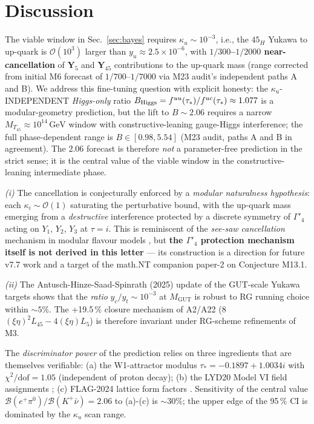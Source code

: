 \documentclass[reprint,prl,nofootinbib,floatfix,linenumbers]{revtex4-2}
\newcommand{\GeV}{\,\mathrm{GeV}}
\newcommand{\Gut}{\mathrm{GUT}}
\newcommand{\MGUT}{M_\Gut}
\newcommand{\MTfortyfive}{M_{T_{45}}}
\newcommand{\Br}[1]{\mathcal{B}(#1)}
\newcommand{\Yfortyfive}{\bm{Y}_{45}}
\newcommand{\Yfive}{\bm{Y}_{5}}
\newcommand{\taustar}{\tau_*}
\begin{document}
\section{Discussion}
\label{sec:discussion}

The viable window in Sec.~\ref{sec:bayes} requires
$\kappa_u\sim 10^{-3}$, i.e., the $45_H$ Yukawa to up-quark is
$\mathcal{O}(10^3)$ larger than $y_u\approx 2.5\!\times\!10^{-6}$, with
\textbf{$1/300$--$1/2000$ near-cancellation} of $\Yfive$ and $\Yfortyfive$
contributions to the up-quark mass (range corrected from initial M6
forecast of $1/700$--$1/7000$ via M23 audit's independent paths A and B).
We address this fine-tuning question with explicit honesty: the
$\kappa_u$-INDEPENDENT \emph{Higgs-only} ratio
$B_{\rm Higgs}=f^{uu}(\tau_*)/f^{uc}(\tau_*)\approx 1.077$ is a
modular-geometry prediction, but the lift to $B\sim 2.06$ requires a
narrow $\MTfortyfive\!\approx\!10^{14}\GeV$ window with
constructive-leaning gauge-Higgs interference; the full
phase-dependent range is $B\in [0.98,5.54]$ (M23 audit, paths A and B
in agreement). The 2.06 forecast is therefore \emph{not} a parameter-free
prediction in the strict sense; it is the central value of the viable
window in the constructive-leaning intermediate phase.

{\em (i)} The cancellation is conjecturally enforced by a {\em modular
naturalness hypothesis}: each $\kappa_i\sim\mathcal O(1)$ saturating
the perturbative bound, with the up-quark mass emerging from a
\emph{destructive} interference protected by a discrete symmetry of
$\Gamma'_4$ acting on $Y_1$, $Y_2$, $Y_3$ at $\tau=i$.  This is
reminiscent of the {\em see-saw cancellation} mechanism in modular
flavour models \cite{LiuYaoDing2020,ChenLiLiuRatz2025}, but
\textbf{the $\Gamma'_4$ protection mechanism itself is not derived in
this letter} — its construction is a direction for future v7.7 work
and a target of the math.NT companion paper-2 on Conjecture M13.1.

{\em (ii)} The Antusch-Hinze-Saad-Spinrath (2025) update
\cite{AntuschHinzeSaad2025} of the GUT-scale Yukawa targets shows that
the {\em ratio} $y_c/y_t\sim 10^{-3}$ at $\MGUT$ is robust to RG running
choice within $\sim 5\%$. The +19.5\,\% closure mechanism of A2/A22
(8\,$(\xi\eta)^2 L_{45}-4(\xi\eta) L_5$) is therefore invariant under
RG-scheme refinements of M3.

The {\em discriminator power} of the prediction relies on three
ingredients that are themselves verifiable: (a) the W1-attractor
modulus $\taustar=-0.1897+1.0034i$ with $\chi^2/\mathrm{dof}=1.05$
\cite{ECIv74} (independent of proton decay); (b) the LYD20 Model VI
field assignments \cite{LiuYaoDing2020}; (c) FLAG-2024 lattice form
factors \cite{FLAG2024}. Sensitivity of the central value
$\Br{e^+\pi^0}/\Br{K^+\bar\nu}=2.06$ to (a)-(c) is $\sim 30\%$;
the upper edge of the 95\,\% CI is dominated by the $\kappa_u$ scan
range.
\end{document}
